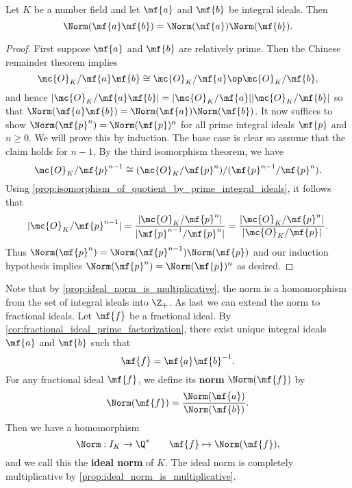     \begin{proposition}\label{prop:ideal_norm_is_multiplicative}
      Let $K$ be a number field and let $\mf{a}$ and $\mf{b}$ be integral ideals. Then
      \[
        \Norm(\mf{a}\mf{b}) = \Norm(\mf{a})\Norm(\mf{b}).
      \]
    \end{proposition}
    \begin{proof}
      First suppose $\mf{a}$ and $\mf{b}$ are relatively prime. Then the Chinese remainder theorem implies
      \[
        \mc{O}_{K}/\mf{a}\mf{b} \cong \mc{O}_{K}/\mf{a} \op \mc{O}_{K}/\mf{b},
      \]
      and hence $|\mc{O}_{K}/\mf{a}\mf{b}| = |\mc{O}_{K}/\mf{a}||\mc{O}_{K}/\mf{b}|$ so that $\Norm(\mf{a}\mf{b}) = \Norm(\mf{a})\Norm(\mf{b})$. It now suffices to show $\Norm(\mf{p}^{n}) = \Norm(\mf{p})^{n}$ for all prime integral ideals $\mf{p}$ and $n \ge 0$. We will prove this by induction. The base case is clear so assume that the claim holds for $n-1$. By the third isomorphism theorem, we have
      \[
        \mc{O}_{K}/\mf{p}^{n-1} \cong (\mc{O}_{K}/\mf{p}^{n})/(\mf{p}^{n-1}/\mf{p}^{n}).
      \]
      Using \cref{prop:isomorphism_of_quotient_by_prime_integral_ideals}, it follows that
      \[
        |\mc{O}_{K}/\mf{p}^{n-1}| = \frac{|\mc{O}_{K}/\mf{p}^{n}|}{|\mf{p}^{n-1}/\mf{p}^{n}|} = \frac{|\mc{O}_{K}/\mf{p}^{n}|}{|\mc{O}_{K}/\mf{p}|}.
      \]
      Thus $\Norm(\mf{p}^{n}) = \Norm(\mf{p}^{n-1})\Norm(\mf{p})$ and our induction hypothesis implies $\Norm(\mf{p}^{n}) = \Norm(\mf{p})^{n}$ as desired.
    \end{proof}

    Note that by \cref{prop:ideal_norm_is_multiplicative}, the norm is a homomorphism from the set of integral ideals into $\Z_{+}$. As last we can extend the norm to fractional ideals. Let $\mf{f}$ be a fractional ideal. By \cref{cor:fractional_ideal_prime_factorization}, there exist unique integral ideals $\mf{a}$ and $\mf{b}$ such that
    \[
      \mf{f} = \mf{a}\mf{b}^{-1}.
    \]
    For any fractional ideal $\mf{f}$, we define its \textbf{norm} $\Norm(\mf{f})$ by
    \[
      \Norm(\mf{f}) = \frac{\Norm(\mf{a})}{\Norm(\mf{b})}.
    \]
    Then we have a homomorphism
    \[
      \Norm:I_{K} \to \Q^{\ast} \qquad \mf{f} \mapsto \Norm(\mf{f}),
    \]
    and we call this the \textbf{ideal norm} of $K$. The ideal norm is completely multiplicative by \cref{prop:ideal_norm_is_multiplicative}.
